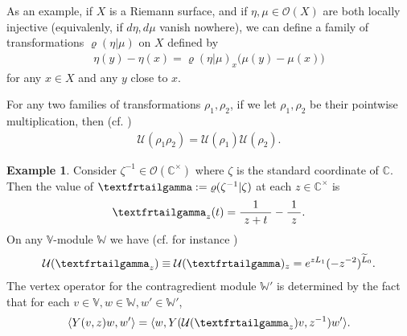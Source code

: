 \documentclass[12pt,a4paper,notitlepage]{article}
\theoremstyle{definition}
\newtheorem{eg}[df]{Example}
\theoremstyle{plain}
\newcommand{\mc}{\mathcal}
\newcommand{\wtd}{\widetilde}
\newcommand{\bk}[1]{\langle {#1}\rangle}
\newcommand{\scr}{\mathscr}
\newcommand{\Vbb}{\mathbb V}
\newcommand{\Wbb}{\mathbb W}
\newcommand{\Cbb}{\mathbb C}
\newcommand{\tipxgamma}{\text{\textfrtailgamma}}
\numberwithin{equation}{subsection}
\begin{document}
As an example, if $X$ is a Riemann surface, and if $\eta,\mu\in\scr O(X)$ are both locally injective (equivalenly, if $d\eta,d\mu$ vanish nowhere), we can define a family of transformations $\varrho(\eta|\mu)$  on $X$ defined by
\begin{align}
\eta(y)-\eta(x)=\varrho(\eta|\mu)_x\Big(\mu(y)-\mu(x)\Big)	
\end{align}
for any $x\in X$ and any $y$ close to $x$.

For any two families of transformations $\rho_1,\rho_2$, if we let $\rho_1,\rho_2$ be their pointwise multiplication, then (cf. \cite[Sec. 4.2]{Hua97})
\begin{align*}
\mc U(\rho_1\rho_2)=\mc U(\rho_1)\mc U(\rho_2).	
\end{align*}

\begin{eg}\label{lb36}
Consider $\zeta^{-1}\in\scr O(\Cbb^\times)$ where $\zeta$ is the standard coordinate of $\Cbb$. Then the value of $\tipxgamma:=\varrho(\zeta^{-1}|\zeta)$ at each $z\in\Cbb^\times$ is \index{zz@$\tipxgamma$}
\begin{align*}
\tipxgamma_z(t)=\frac 1{~z+t~}-\frac 1{~z~}.	
\end{align*}
On any $\Vbb$-module $\Wbb$ we have (cf. for instance \cite[Ex. 1.4]{Gui20b})
\begin{align}
\mc U(\tipxgamma_z)\equiv\mc U(\tipxgamma)_z=e^{z L_1}(-z^{-2})^{\wtd L_0}.	
\end{align}
The vertex operator for the contragredient module $\Wbb'$ is determined by the fact that for each $v\in\Vbb,w\in\Wbb,w'\in\Wbb'$,
\begin{align*}
\bk{Y(v,z)w,w'}=\bk{w,Y(\mc U(\tipxgamma_z)v,z^{-1})w'}.
\end{align*}
\end{eg}
\end{document}

